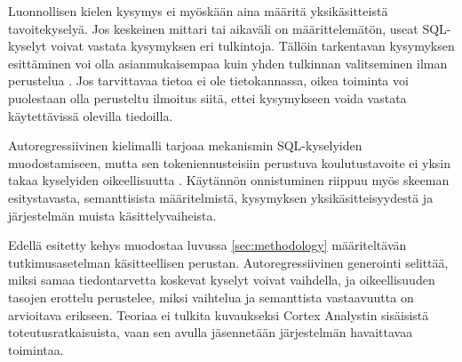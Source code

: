 Luonnollisen kielen kysymys ei myöskään aina määritä
yksikäsitteistä tavoitekyselyä. Jos keskeinen mittari
tai aikaväli on määrittelemätön, useat SQL-kyselyt
voivat vastata kysymyksen eri tulkintoja. Tällöin
tarkentavan kysymyksen esittäminen voi olla
asianmukaisempaa kuin yhden tulkinnan valitseminen
ilman perustelua \cite{min2020ambigqa}. Jos tarvittavaa tietoa ei ole
tietokannassa, oikea toiminta voi puolestaan olla
perusteltu ilmoitus siitä, ettei kysymykseen voida
vastata käytettävissä olevilla tiedoilla.

Autoregressiivinen kielimalli tarjoaa
mekanismin SQL-kyselyiden muodostamiseen,
mutta sen tokeniennusteisiin perustuva koulutustavoite
ei yksin takaa kyselyiden oikeellisuutta \cite{ouyang2022training}.
Käytännön onnistuminen riippuu myös skeeman
esitystavasta, semanttisista määritelmistä,
kysymyksen yksikäsitteisyydestä ja järjestelmän
muista käsittelyvaiheista.

Edellä esitetty kehys muodostaa luvussa \ref{sec:methodology}
määriteltävän tutkimusasetelman käsitteellisen perustan.
Autoregressiivinen generointi selittää, miksi samaa
tiedontarvetta koskevat kyselyt voivat vaihdella, ja
oikeellisuuden tasojen erottelu perustelee, miksi vaihtelua
ja semanttista vastaavuutta on arvioitava erikseen. Teoriaa
ei tulkita kuvaukseksi Cortex Analystin sisäisistä
toteutusratkaisuista, vaan sen avulla jäsennetään järjestelmän
havaittavaa toimintaa.
